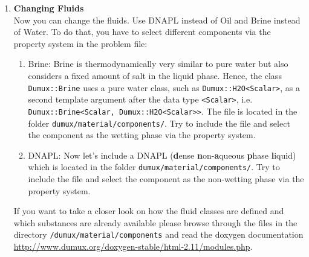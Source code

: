 \begin{enumerate}
\item \textbf{Changing Fluids} \\
Now you can change the fluids. Use DNAPL instead of Oil and Brine instead of Water.
To do that, you have to select different components via the property system in the problem file:
\begin{enumerate}
 \item Brine: Brine is thermodynamically very similar to pure water but also
 considers a fixed amount of salt in the liquid phase.
  Hence, the class \texttt{Dumux::Brine} uses a pure water class, such as \texttt{Dumux::H2O<Scalar>},
  as a second template argument after the data type \texttt{<Scalar>}, i.e.
  \texttt{Dumux::Brine<Scalar, Dumux::H2O<Scalar>>}. The file is located in the folder \texttt{dumux/material/components/}.
  Try to include the file and select the component as the wetting phase via the property system.
 \item DNAPL:
  Now let's include a DNAPL (\textbf{d}ense \textbf{n}on-\textbf{a}queous \textbf{p}hase \textbf{l}iquid)
  which is located in the folder \texttt{dumux/material/components/}. Try to
  include the file and select the component as the non-wetting phase via the property system.
\end{enumerate}
If you want to take a closer look on how the fluid classes are defined and which
substances are already available please browse through the files in the directory
\texttt{/dumux/material/components} and read 
the doxygen documentation \url{http://www.dumux.org/doxygen-stable/html-2.11/modules.php}.


\end{enumerate}

